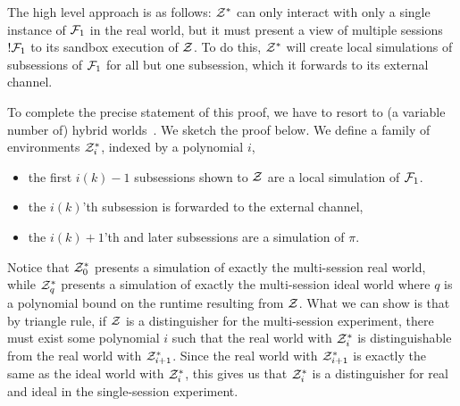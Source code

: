 The high level approach is as follows: $\mathcal{Z}^*$ can only interact with only a single instance of $\mathcal{F}_1$ in the real world, but it must present a view of multiple sessions $!\mathcal{F}_1$ to its sandbox execution of $\mathcal{Z}$.
To do this, $\mathcal{Z}^*$ will create local simulations of subsessions of $\mathcal{F}_1$ for all but one subsession, which it forwards to its external channel.

To complete the precise statement of this proof, we have to resort to (a variable number of) hybrid worlds~\cite{canettiUC,variablehybrids}. We sketch the proof below.
We define a family of environments $\mathcal{Z}^*_i$, indexed by a polynomial $i$,
\begin{itemize}
\item the first $i(k)-1$ subsessions shown to $\mathcal{Z}$ are a local simulation of $\mathcal{F}_1$.
\item the $i(k)$'th subsession is forwarded to the external channel,
\item the $i(k)+1$'th and later subsessions are a simulation of $\pi$.
\end{itemize}
Notice that $\mathcal{Z}^*_0$ presents a simulation of exactly the multi-session real world, while $\mathcal{Z}^*_q$ presents a simulation of exactly the multi-session ideal world where $q$ is a polynomial bound on the runtime resulting from $\mathcal{Z}$.
What we can show is that by triangle rule, if $\mathcal{Z}$ is a distinguisher for the multi-session experiment, there must exist some polynomial $i$ such that the real world with $\mathcal{Z}^*_i$ is distinguishable from the real world with $\mathcal{Z}^*_{i+1}$. Since the real world with $\mathcal{Z}^*_{i+1}$ is exactly the same as the ideal world with $\mathcal{Z}^*_i$, this gives us that $\mathcal{Z}^*_i$ is a distinguisher for real and ideal in the single-session experiment.

